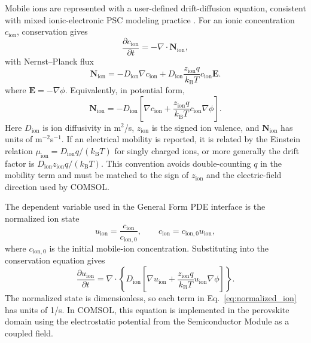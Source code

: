 Mobile ions are represented with a user-defined drift-diffusion equation,
consistent with mixed ionic-electronic PSC modeling practice
\cite{Richardson_2016,Calado_2022_Driftfusion}. For an ionic concentration
$c_{\mathrm{ion}}$, conservation gives
\begin{equation}
\frac{\partial c_{\mathrm{ion}}}{\partial t}
= -\nabla\cdot\mathbf{N}_{\mathrm{ion}},
\end{equation}
with Nernst--Planck flux
\begin{equation}
\mathbf{N}_{\mathrm{ion}}
= -D_{\mathrm{ion}}\nabla c_{\mathrm{ion}}
+D_{\mathrm{ion}}\frac{z_{\mathrm{ion}}q}{k_{\mathrm{B}}T}
c_{\mathrm{ion}}\mathbf{E}.
\label{eq:ion_flux}
\end{equation}
where $\mathbf{E}=-\nabla\phi$. Equivalently, in potential form,
\begin{equation}
\mathbf{N}_{\mathrm{ion}}
=
-D_{\mathrm{ion}}
\left[
\nabla c_{\mathrm{ion}}
+\frac{z_{\mathrm{ion}}q}{k_{\mathrm{B}}T}
c_{\mathrm{ion}}\nabla\phi
\right].
\end{equation}
Here $D_{\mathrm{ion}}$ is ion diffusivity in m$^2$/s,
$z_{\mathrm{ion}}$ is the signed ion valence, and
$\mathbf{N}_{\mathrm{ion}}$ has units of m$^{-2}$s$^{-1}$. If an electrical
mobility is reported, it is related by the Einstein relation
$\mu_{\mathrm{ion}}=D_{\mathrm{ion}}q/(k_{\mathrm{B}}T)$ for singly charged
ions, or more generally the drift factor is
$D_{\mathrm{ion}}z_{\mathrm{ion}}q/(k_{\mathrm{B}}T)$. This convention avoids
double-counting $q$ in the mobility term and must be matched to the sign of
$z_{\mathrm{ion}}$ and the electric-field direction used by COMSOL.

The dependent variable used in the General Form PDE interface is the normalized
ion state
\begin{equation}
u_{\mathrm{ion}}=\frac{c_{\mathrm{ion}}}{c_{\mathrm{ion},0}},
\qquad
c_{\mathrm{ion}}=c_{\mathrm{ion},0}u_{\mathrm{ion}},
\end{equation}
where $c_{\mathrm{ion},0}$ is the initial mobile-ion concentration. Substituting
into the conservation equation gives
\begin{equation}
\frac{\partial u_{\mathrm{ion}}}{\partial t}
=
\nabla\cdot
\left\{
D_{\mathrm{ion}}
\left[
\nabla u_{\mathrm{ion}}
+\frac{z_{\mathrm{ion}}q}{k_{\mathrm{B}}T}
u_{\mathrm{ion}}\nabla\phi
\right]
\right\}.
\label{eq:normalized_ion}
\end{equation}
The normalized state is dimensionless, so each term in
Eq.~\ref{eq:normalized_ion} has units of 1/s. In COMSOL, this equation is
implemented in the perovskite domain using the electrostatic potential from the
Semiconductor Module as a coupled field.

